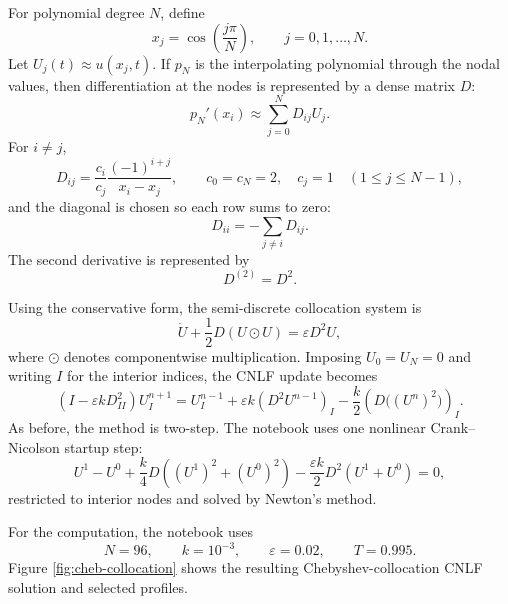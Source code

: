 \documentclass[11pt]{article}
\begin{document}
For polynomial degree $N$, define
\begin{equation}
    x_j=\cos\left(\frac{j\pi}{N}\right),
    \qquad
    j=0,1,\ldots,N.
\end{equation}
Let $U_j(t)\approx u(x_j,t)$.  If $p_N$ is the interpolating polynomial through the nodal values, then differentiation at the nodes is represented by a dense matrix $D$:
\begin{equation}
    p_N'(x_i)\approx \sum_{j=0}^{N}D_{ij}U_j.
\end{equation}
For $i\neq j$,
\begin{equation}
    D_{ij}
    =
    \frac{c_i}{c_j}
    \frac{(-1)^{i+j}}{x_i-x_j},
    \qquad
    c_0=c_N=2,\quad c_j=1\quad(1\le j\le N-1),
\end{equation}
and the diagonal is chosen so each row sums to zero:
\begin{equation}
    D_{ii}=-\sum_{j\neq i}D_{ij}.
\end{equation}
The second derivative is represented by
\begin{equation}
    D^{(2)}=D^2.
\end{equation}

Using the conservative form, the semi-discrete collocation system is
\begin{equation}
    \dot U+\frac{1}{2}D(U\odot U)=\varepsilon D^2U,
    \label{eq:cheb-semidiscrete}
\end{equation}
where $\odot$ denotes componentwise multiplication.  Imposing $U_0=U_N=0$ and writing $I$ for the interior indices, the CNLF update becomes
\begin{equation}
    \left(I-\varepsilon k D^2_{II}\right)U_I^{n+1}
    =
    U_I^{n-1}
    +
    \varepsilon k (D^2U^{n-1})_I
    -
    \frac{k}{2}\left(D\bigl((U^n)^2\bigr)\right)_I.
    \label{eq:cheb-cnlf}
\end{equation}
As before, the method is two-step.  The notebook uses one nonlinear Crank--Nicolson startup step:
\begin{equation}
    U^1-U^0
    +
    \frac{k}{4}D\left((U^1)^2+(U^0)^2\right)
    -
    \frac{\varepsilon k}{2}D^2(U^1+U^0)
    =
    0,
    \label{eq:cheb-startup}
\end{equation}
restricted to interior nodes and solved by Newton's method.

For the computation, the notebook uses
\begin{equation}
    N=96,\qquad
    k=10^{-3},\qquad
    \varepsilon=0.02,\qquad
    T=0.995.
\end{equation}
Figure \ref{fig:cheb-collocation} shows the resulting Chebyshev-collocation CNLF solution and selected profiles.
\end{document}
